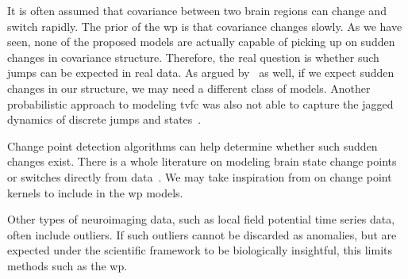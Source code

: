 It is often assumed that covariance between two brain regions can change and switch rapidly.
The prior of the \gls{wp} is that covariance changes slowly.
As we have seen, none of the proposed models are actually capable of picking up on sudden changes in covariance structure.
Therefore, the real question is whether such jumps can be expected in real data.
As argued by~\textcite{Lindquist2014} as well, if we expect sudden changes in our structure, we may need a different class of models.
Another probabilistic approach to modeling \gls{tvfc} was also not able to capture the jagged dynamics of discrete jumps and states~\parencite{Li2019b}.

Change point detection algorithms can help determine whether such sudden changes exist.
There is a whole literature on modeling brain state change points or switches directly from data~\parencite[see e.g.][]{Robinson2010, Cribben2012, Cribben2013, Lindquist2014, Ou2014, Xu2015, Kim2021, Anastasiou2022}.
We may take inspiration from \textcite{Saatci2010, Wilson2013} on change point kernels to include in the \gls{wp} models.

Other types of neuroimaging data, such as local field potential time series data, often include outliers.
If such outliers cannot be discarded as anomalies, but are expected under the scientific framework to be biologically insightful, this limits methods such as the \gls{wp}.
